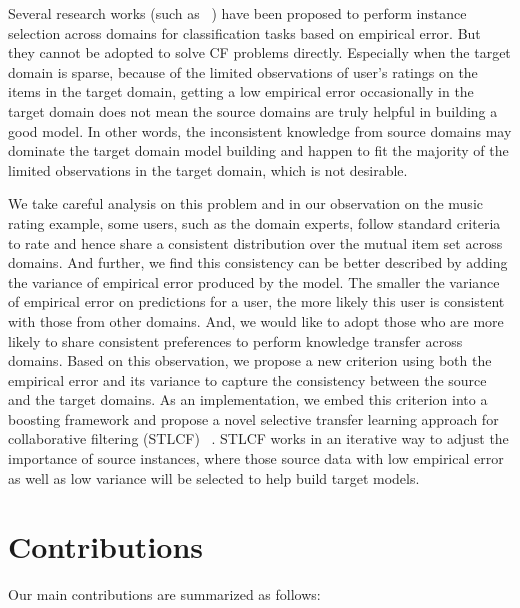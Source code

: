 Several research works (such as ~\cite{DBLP:conf/icml/DaiYXY07}) have been proposed to perform instance selection across domains for classification tasks based on empirical error. But they cannot be adopted to solve CF problems directly. Especially when the target domain is sparse, because of the limited observations of user's ratings on the items in the target domain, getting a low empirical error occasionally in the target domain does not mean the source domains are truly helpful in building a good model. In other words, the inconsistent knowledge from source domains may dominate the target domain model building and happen to fit the majority of the limited observations in the target domain, which is not desirable.

We take careful analysis on this problem and in our observation on the music rating example, some users, such as the domain experts, follow standard criteria to rate and hence share a consistent distribution over the mutual item set across domains. And further, we find this consistency can be better described by adding the variance of empirical error produced by the model. The smaller the variance of empirical error on predictions for a user, the more likely this user is consistent with those from other domains. And, we would like to adopt those who are more likely to share consistent preferences to perform knowledge transfer across domains.
Based on this observation, we propose a new criterion using both the empirical error and its variance to capture the consistency between the source and the target domains. As an implementation, we embed this criterion into a boosting framework and propose a novel selective transfer learning approach for collaborative filtering (STLCF) ~\cite{zhongqi2013selective}.
STLCF works in an iterative way to adjust the importance of source instances, where those source data with low empirical error as well as low variance will be selected to help build target models.

\hspace{0.1in}
\section{Contributions}

Our main contributions are summarized as follows:

